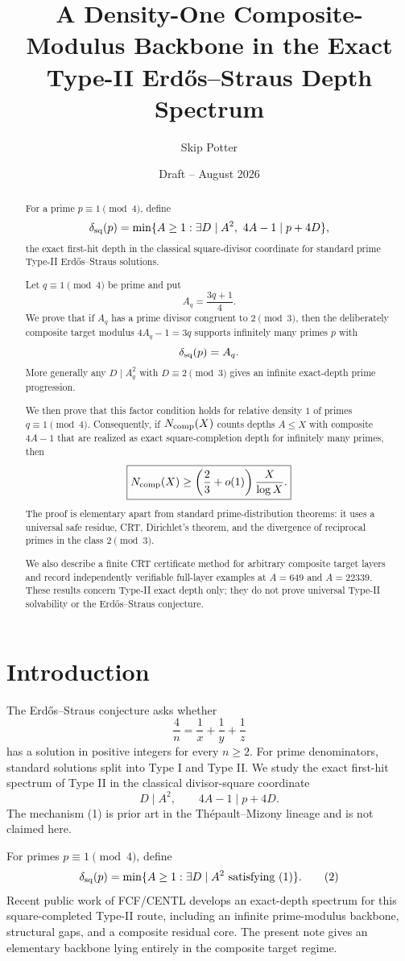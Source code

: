 \documentclass[11pt]{article}
\title{A Density-One Composite-Modulus Backbone in the Exact Type-II Erd\H{o}s--Straus Depth Spectrum}
\author{Skip Potter}
\date{Draft -- August 2026}
\theoremstyle{definition}
\begin{document}
\maketitle

\begin{abstract}
For a prime $p\equiv1\pmod4$, define
\[
\delta_{\rm sq}(p)=\min\{A\ge1:\exists D\mid A^2,\ 4A-1\mid p+4D\},
\]
the exact first-hit depth in the classical square-divisor coordinate for standard prime Type-II Erd\H{o}s--Straus solutions.

Let $q\equiv1\pmod4$ be prime and put
\[
A_q=\frac{3q+1}{4}.
\]
We prove that if $A_q$ has a prime divisor congruent to $2\pmod3$, then the deliberately composite target modulus $4A_q-1=3q$ supports infinitely many primes $p$ with
\[
\delta_{\rm sq}(p)=A_q.
\]
More generally any $D\mid A_q^2$ with $D\equiv2\pmod3$ gives an infinite exact-depth prime progression.

We then prove that this factor condition holds for relative density $1$ of primes $q\equiv1\pmod4$.  Consequently, if $N_{\rm comp}(X)$ counts depths $A\le X$ with composite $4A-1$ that are realized as exact square-completion depth for infinitely many primes, then
\[
\boxed{N_{\rm comp}(X)\ge\left(\frac23+o(1)\right)\frac{X}{\log X}.}
\]
The proof is elementary apart from standard prime-distribution theorems: it uses a universal safe residue, CRT, Dirichlet's theorem, and the divergence of reciprocal primes in the class $2\pmod3$.

We also describe a finite CRT certificate method for arbitrary composite target layers and record independently verifiable full-layer examples at $A=649$ and $A=22339$.  These results concern Type-II exact depth only; they do not prove universal Type-II solvability or the Erd\H{o}s--Straus conjecture.
\end{abstract}

\section{Introduction}
The Erd\H{o}s--Straus conjecture asks whether
\[
\frac4n=\frac1x+\frac1y+\frac1z
\]
has a solution in positive integers for every $n\ge2$.  For prime denominators, standard solutions split into Type I and Type II.  We study the exact first-hit spectrum of Type II in the classical divisor-square coordinate
\[
D\mid A^2,\qquad 4A-1\mid p+4D. \tag{1}
\]
The mechanism (1) is prior art in the Th\'epault--Mizony lineage and is not claimed here.

For primes $p\equiv1\pmod4$, define
\[
\delta_{\rm sq}(p)=\min\{A\ge1:\exists D\mid A^2\text{ satisfying (1)}\}. \tag{2}
\]
Recent public work of FCF/CENTL develops an exact-depth spectrum for this square-completed Type-II route, including an infinite prime-modulus backbone, structural gaps, and a composite residual core.  The present note gives an elementary backbone lying entirely in the composite target regime.
\end{document}
